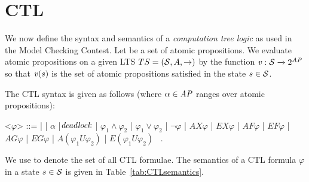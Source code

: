 \documentclass{llncs}
\begin{document}
\section{CTL}

We now define the syntax and semantics of a \emph{computation tree logic} 
as used in the Model Checking Contest.
Let \props be a set of atomic propositions.
We evaluate atomic propositions on a given LTS
$TS = (\mathcal{S}, A, \mathcal{\rightarrow})$ 
by the function $\mathit{v} : \mathcal{S} \xrightarrow{} 2^{\mathit{AP}}$ so that
 $\mathit{v}(s)$ is the set of atomic propositions satisfied 
in the state $s \in \mathcal{S}$.

The CTL syntax is given as follows (where $\alpha \in \mathit{AP}$ ranges over atomic propositions):
\newcommand{\indalt}[1][2]{\\\hspace*{1pt}\textbar\hspace*{3.5pt}}
\begin{grammar}
    \let\syntleft\relax
    \let\syntright\relax

    <$\varphi$> ::= \true | \false | $\alpha$ |$\mathit{deadlock}$ | $\varphi_{1} \land \varphi_{2}$ | $\varphi_{1} \lor \varphi_{2}$ | $ \neg\varphi$ 
| $\mathit{AX}\varphi$ | $\mathit{EX}\varphi$ | $\mathit{AF}\varphi$ | $\mathit{EF}\varphi$ | $\mathit{AG}\varphi$ | $\mathit{EG}\varphi$ | $\mathit{A}(\varphi_1\mathit{U}\varphi_2)$ | $\mathit{E}(\varphi_1\mathit{U}\varphi_2)$ \ .
\end{grammar}
We use \ctlformulas to denote the set of all CTL formulae.
The semantics of a CTL formula $\varphi$ in a state $s \in \mathcal{S}$ 
is given in Table~\ref{tab:CTLsemantics}. 
\end{document}
